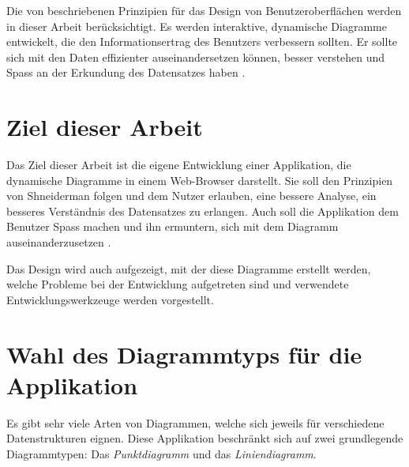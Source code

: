 Die von \citeauthor{shneiderman} beschriebenen Prinzipien für das Design von Benutzeroberflächen werden in dieser Arbeit berücksichtigt. Es werden interaktive, dynamische Diagramme entwickelt, die den Informationsertrag des Benutzers verbessern sollten. Er sollte sich mit den Daten effizienter auseinandersetzen können, besser verstehen und Spass an der Erkundung des Datensatzes haben \cite{shneiderman}.

\section{Ziel dieser Arbeit}

Das Ziel dieser Arbeit ist die eigene Entwicklung einer Applikation, die dynamische Diagramme in einem Web-Browser darstellt. Sie soll den Prinzipien von Shneiderman folgen und dem Nutzer erlauben, eine bessere Analyse, ein besseres Verständnis des Datensatzes zu erlangen. Auch soll die Applikation dem Benutzer Spass machen und ihn ermuntern, sich mit dem Diagramm auseinanderzusetzen \cite{shneiderman}.

Das Design wird auch aufgezeigt, mit der diese Diagramme erstellt werden, welche Probleme bei der Entwicklung aufgetreten sind und verwendete Entwicklungswerkzeuge werden vorgestellt.

\section{Wahl des Diagrammtyps für die Applikation}

Es gibt sehr viele Arten von Diagrammen, welche sich jeweils für verschiedene Datenstrukturen eignen. 
Diese Applikation beschränkt sich auf zwei grundlegende Diagrammtypen: Das \textit{Punktdiagramm} und das \textit{Liniendiagramm}.

